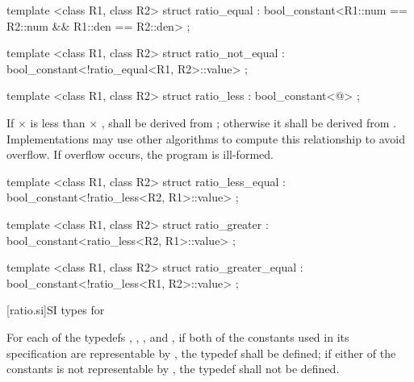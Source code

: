 \begin{itemdecl}
template <class R1, class R2> struct ratio_equal
  : bool_constant<R1::num == R2::num && R1::den == R2::den> { };
\end{itemdecl}

\begin{itemdecl}
template <class R1, class R2> struct ratio_not_equal
  : bool_constant<!ratio_equal<R1, R2>::value> { };
\end{itemdecl}

\begin{itemdecl}
template <class R1, class R2> struct ratio_less
  : bool_constant<@\seebelow@> { };
\end{itemdecl}

\begin{itemdescr}
\pnum
If  $\times$  is less than  $\times$ ,
 shall be
derived from ; otherwise it shall be derived from
. Implementations may use other algorithms to
compute this relationship to avoid overflow. If overflow occurs, the program is ill-formed.
\end{itemdescr}

\begin{itemdecl}
template <class R1, class R2> struct ratio_less_equal
  : bool_constant<!ratio_less<R2, R1>::value> { };
\end{itemdecl}

\begin{itemdecl}
template <class R1, class R2> struct ratio_greater
  : bool_constant<ratio_less<R2, R1>::value> { };
\end{itemdecl}

\begin{itemdecl}
template <class R1, class R2> struct ratio_greater_equal
  : bool_constant<!ratio_less<R1, R2>::value> { };
\end{itemdecl}

[ratio.si]{SI types for }

\pnum
For each of the typedefs , , , and ,
if both of the constants used in its specification are representable by
, the typedef shall be defined; if either of the constants is not
representable by , the typedef shall not be defined.

